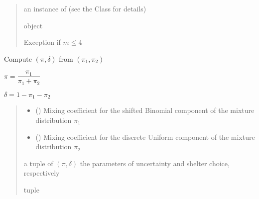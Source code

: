 \documentclass[letterpaper,10pt,english]{sphinxmanual}
\begin{document}
\begin{fulllineitems}
\begin{quote}
\begin{description}
\begin{itemize}
\end{itemize}

\sphinxAtStartPar
an instance of  (see the Class for details)

\sphinxAtStartPar
object

\sphinxAtStartPar
Exception if \(m \leq 4\)

\end{description}\end{quote}

\end{fulllineitems}


\begin{fulllineitems}
\label{\detokenize{cubmods:cubmods.cubsh.pi1pi2_to_pidelta}}
\pysigstartsignatures
{}
\pysigstopsignatures
\sphinxAtStartPar
Compute \((\pi, \delta)\) from \((\pi_1, \pi_2)\)

\sphinxAtStartPar
\(\pi = \dfrac{\pi_1}{\pi_1 + \pi_2}\)

\sphinxAtStartPar
\(\delta = 1 - \pi_1 - \pi_2\)
\begin{quote}\begin{description}
\begin{itemize}
\item {} 
\sphinxAtStartPar
{} () \textendash{} Mixing coefficient for the shifted Binomial component of the mixture distribution \(\pi_1\)

\item {} 
\sphinxAtStartPar
{} () \textendash{} Mixing coefficient for the discrete Uniform component of the mixture distribution \(\pi_2\)

\end{itemize}

\sphinxAtStartPar
a tuple of \((\pi, \delta)\) the parameters of 
uncertainty and shelter choice, respectively

\sphinxAtStartPar
tuple

\end{description}\end{quote}

\end{fulllineitems}
\end{document}
